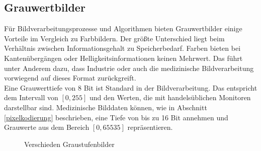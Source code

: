 \subsection{Grauwertbilder} \label{grey_images}

Für Bildverarbeitungsprozesse und Algorithmen bieten Grauwertbilder einige Vorteile im Vergleich zu Farbbildern. Der größte Unterschied liegt beim Verhältnis zwischen Informationsgehalt zu Speicherbedarf. Farben bieten bei Kantenübergängen oder Helligkeitsinformationen keinen Mehrwert. Das führt unter Anderem dazu, dass Industrie oder auch die medizinische Bildverarbeitung vorwiegend auf dieses Format zurückgreift.\\
Eine Grauwerttiefe von 8 Bit ist Standard in der Bildverarbeitung. Das entspricht dem Intervall von $[0,255]$ und den Werten, die mit handelsüblichen Monitoren darstellbar sind. Medizinische Bilddaten können, wie in Abschnitt \ref{pixelkodierung} beschrieben, eine Tiefe von bis zu 16 Bit annehmen und Grauwerte aus dem Bereich $[0,65535]$ repräsentieren.

\begin{figure}[htb]
\centering
{}
\caption{Verschieden Graustufenbilder}
\label{grey}
\end{figure}


